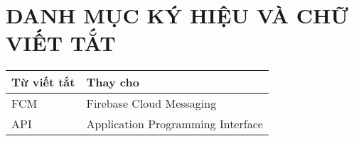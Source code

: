 


\clearpage
\pagestyle{empty} %
{}
\tableofcontents %

\clearpage
\pagestyle{plain} %

\cleardoublepage

\section*{DANH MỤC KÝ HIỆU VÀ CHỮ VIẾT TẮT}%

\begin{table}[H]
  \centering
  \begin{tabularx}{0.85\textwidth}{
  | >{\centering\arraybackslash}m{3cm}
  | >{\centering\arraybackslash}X|
  }
  \hline
  \bfseries Từ viết tắt     &\bfseries Thay cho\hspace{1cm}\\ \hline
  FCM     & Firebase Cloud Messaging \\ \hline
  API     & Application Programming Interface \\ \hline

  
  \end{tabularx}
\end{table}
\cleardoublepage

